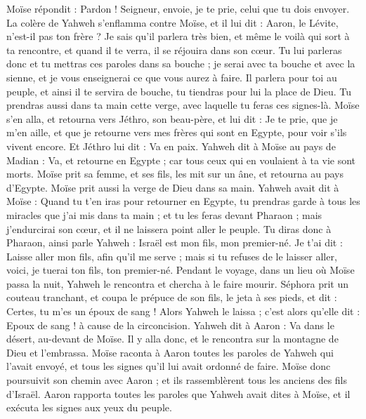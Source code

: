 \begin{multicols}{2}
Moïse répondit : Pardon ! Seigneur, envoie, je te prie, celui que tu dois envoyer.
La colère de Yahweh s’enflamma contre Moïse, et il lui dit : Aaron, le Lévite, n'est-il pas ton frère ? Je sais qu'il parlera très bien, et même le voilà qui sort à ta rencontre, et quand il te verra, il se réjouira dans son cœur.
Tu lui parleras donc et tu mettras ces paroles dans sa bouche ; je serai avec ta bouche et avec la sienne, et je vous enseignerai ce que vous aurez à faire.
Il parlera pour toi au peuple, et ainsi il te servira de bouche, tu tiendras pour lui la place de Dieu.
Tu prendras aussi dans ta main cette verge, avec laquelle tu feras ces signes-là.
Moïse s'en alla, et retourna vers Jéthro, son beau-père, et lui dit : Je te prie, que je m'en aille, et que je retourne vers mes frères qui sont en Egypte, pour voir s'ils vivent encore. Et Jéthro lui dit : Va en paix.
Yahweh dit à Moïse au pays de Madian : Va, et retourne en Egypte ; car tous ceux qui en voulaient à ta vie sont morts.
Moïse prit sa femme, et ses fils, les mit sur un âne, et retourna au pays d'Egypte. Moïse prit aussi la verge de Dieu dans sa main.
Yahweh avait dit à Moïse : Quand tu t'en iras pour retourner en Egypte, tu prendras garde à tous les miracles que j'ai mis dans ta main ; et tu les feras devant Pharaon ; mais j'endurcirai son cœur, et il ne laissera point aller le peuple.
Tu diras donc à Pharaon, ainsi parle Yahweh : Israël est mon fils, mon premier-né.
Je t'ai dit : Laisse aller mon fils, afin qu'il me serve ; mais si tu refuses de le laisser aller, voici, je tuerai ton fils, ton premier-né.
Pendant le voyage, dans un lieu où Moïse passa la nuit, Yahweh le rencontra et chercha à le faire mourir.
Séphora prit un couteau tranchant, et coupa le prépuce de son fils, le jeta à ses pieds, et dit : Certes, tu m'es un époux de sang !
Alors Yahweh le laissa ; c’est alors qu’elle dit : Epoux de sang ! à cause de la circoncision.
Yahweh dit à Aaron : Va dans le désert, au-devant de Moïse. Il y alla donc, et le rencontra sur la montagne de Dieu et l’embrassa.
Moïse raconta à Aaron toutes les paroles de Yahweh qui l'avait envoyé, et tous les signes qu'il lui avait ordonné de faire.
Moïse donc poursuivit son chemin avec Aaron ; et ils rassemblèrent tous les anciens des fils d'Israël.
Aaron rapporta toutes les paroles que Yahweh avait dites à Moïse, et il exécuta les signes aux yeux du peuple.

\end{multicols}
